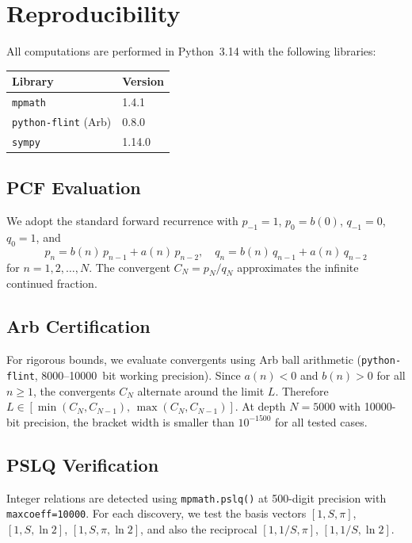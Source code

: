 
\appendix
\section{Reproducibility}\label{app:repro}

All computations are performed in Python~3.14 with the following libraries:

\begin{center}
\begin{tabular}{@{}ll@{}}
\toprule
Library & Version \\
\midrule
\texttt{mpmath} & 1.4.1 \\
\texttt{python-flint} (Arb) & 0.8.0 \\
\texttt{sympy} & 1.14.0 \\
\bottomrule
\end{tabular}
\end{center}

\subsection{PCF Evaluation}

We adopt the standard forward recurrence with $p_{-1} = 1$, $p_0 = b(0)$,
$q_{-1} = 0$, $q_0 = 1$, and
\[
  p_n = b(n)\,p_{n-1} + a(n)\,p_{n-2}, \quad
  q_n = b(n)\,q_{n-1} + a(n)\,q_{n-2}
\]
for $n = 1, 2, \ldots, N$.
The convergent $C_N = p_N / q_N$ approximates the infinite continued fraction.

\subsection{Arb Certification}

For rigorous bounds, we evaluate convergents using Arb ball arithmetic
(\texttt{python-flint}, 8000--10000~bit working precision).
Since $a(n) < 0$ and $b(n) > 0$ for all $n \ge 1$, the convergents
$C_N$ alternate around the limit $L$.
Therefore $L \in [\min(C_N, C_{N-1}),\, \max(C_N, C_{N-1})]$.
At depth $N = 5000$ with 10000-bit precision, the bracket width is
smaller than $10^{-1500}$ for all tested cases.

\subsection{PSLQ Verification}

Integer relations are detected using \texttt{mpmath.pslq()} at 500-digit
precision with \texttt{maxcoeff=10000}.  For each discovery, we test
the basis vectors $[1, S, \pi]$, $[1, S, \ln 2]$, $[1, S, \pi, \ln 2]$,
and also the reciprocal $[1, 1/S, \pi]$, $[1, 1/S, \ln 2]$.

